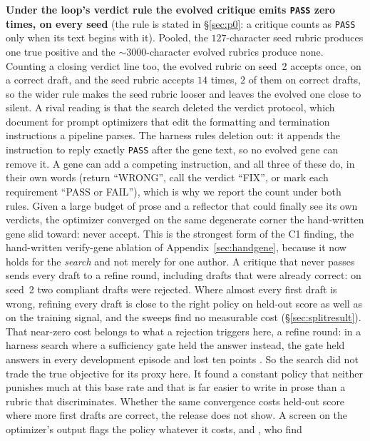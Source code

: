 \documentclass[11pt]{article}
\begin{document}
\textbf{Under the loop's verdict rule the evolved critique emits \texttt{PASS} zero times, on
every seed} (the rule is stated in \S\ref{sec:p0}: a critique counts as \texttt{PASS} only when
its text begins with it). Pooled, the $127$-character seed rubric produces one true positive and
the ${\sim}3000$-character evolved rubrics produce none. Counting a closing verdict line too, the
evolved rubric on seed~2 accepts once, on a correct draft, and the seed rubric accepts
$14$ times, $2$ of them on correct drafts, so the wider rule makes the seed rubric looser and
leaves the evolved one close to silent. A rival reading is that the search deleted the verdict
protocol, which \citet{zhang2026cdfs} document for prompt optimizers that edit the formatting and
termination instructions a pipeline parses. The harness rules deletion out: it appends the
instruction to reply exactly \texttt{PASS} after the gene text, so no evolved gene can remove it. A
gene can add a competing instruction, and all three of these do, in their own words (return
``WRONG'', call the verdict ``FIX'', or mark each requirement ``PASS or FAIL''), which is why we
report the count under both rules. Given a large budget of prose and a reflector that could finally see
its own verdicts, the optimizer converged on the same degenerate corner the hand-written gene
slid toward: never accept. This is the strongest form of the C1 finding, the hand-written
verify-gene ablation of Appendix~\ref{sec:handgene}, because it now holds
for the \emph{search} and not merely for one author. A critique that never passes sends every
draft to a refine round, including drafts that were already correct: on seed~2 two compliant
drafts were rejected. Where almost every first draft is wrong, refining every draft is close to
the right policy on held-out score as well as on the training signal, and the sweeps find no
measurable cost (\S\ref{sec:splitresult}). That near-zero cost belongs to what a rejection
triggers here, a refine round: in a harness search where a sufficiency gate held the answer
instead, the gate held answers in every development episode and lost ten points
\citep{parashar2026vestrum}. So the search did not trade the true objective for its
proxy here. It found a constant policy that neither punishes much at this base rate and that is
far easier to write in prose than a rubric that discriminates. Whether the same convergence costs
held-out score where more first drafts are correct, the release does not show. A screen on the
optimizer's output flags the policy whatever it costs, and \citet{skalse2022reward}, who find
\end{document}
